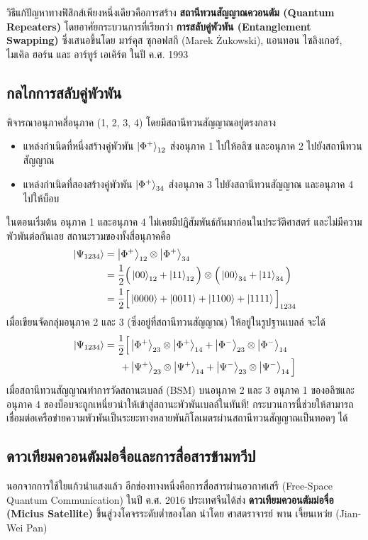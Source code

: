 วิธีแก้ปัญหาทางฟิสิกส์เพียงหนึ่งเดียวคือการสร้าง \textbf{สถานีทวนสัญญาณควอนตัม (Quantum Repeaters)} โดยอาศัยกระบวนการที่เรียกว่า \textbf{การสลับคู่พัวพัน (Entanglement Swapping)} ซึ่งเสนอขึ้นโดย มาร์คุส ซุกอฟสกี (Marek Żukowski), แอนทอน ไซลิงเกอร์, ไมเคิล ฮอร์น และ อาร์ทูร์ เอเคิร์ต ในปี ค.ศ. 1993

\subsection{กลไกการสลับคู่พัวพัน}
พิจารณาอนุภาคสี่อนุภาค (1, 2, 3, 4) โดยมีสถานีทวนสัญญาณอยู่ตรงกลาง
\begin{itemize}
    \item แหล่งกำเนิดที่หนึ่งสร้างคู่พัวพัน $\ket{\Phi^+}_{12}$ ส่งอนุภาค 1 ไปให้อลิซ และอนุภาค 2 ไปยังสถานีทวนสัญญาณ
    \item แหล่งกำเนิดที่สองสร้างคู่พัวพัน $\ket{\Phi^+}_{34}$ ส่งอนุภาค 3 ไปยังสถานีทวนสัญญาณ และอนุภาค 4 ไปให้บ็อบ
\end{itemize}
ในตอนเริ่มต้น อนุภาค 1 และอนุภาค 4 ไม่เคยมีปฏิสัมพันธ์กันมาก่อนในประวัติศาสตร์ และไม่มีความพัวพันต่อกันเลย สถานะรวมของทั้งสี่อนุภาคคือ
\begin{align}
\ket{\Psi_{1234}} &= \ket{\Phi^+}_{12} \otimes \ket{\Phi^+}_{34} \nonumber \\
&= \frac{1}{2} \Big( \ket{00}_{12} + \ket{11}_{12} \Big) \otimes \Big( \ket{00}_{34} + \ket{11}_{34} \Big) \nonumber \\
&= \frac{1}{2} \Big[ \ket{0000} + \ket{0011} + \ket{1100} + \ket{1111} \Big]_{1234}
\end{align}
เมื่อเขียนจัดกลุ่มอนุภาค 2 และ 3 (ซึ่งอยู่ที่สถานีทวนสัญญาณ) ให้อยู่ในรูปฐานเบลล์ จะได้
\begin{align}
\ket{\Psi_{1234}} = \frac{1}{2} \Big[ &\ket{\Phi^+}_{23} \otimes \ket{\Phi^+}_{14} + \ket{\Phi^-}_{23} \otimes \ket{\Phi^-}_{14} \nonumber \\
+ &\ket{\Psi^+}_{23} \otimes \ket{\Psi^+}_{14} + \ket{\Psi^-}_{23} \otimes \ket{\Psi^-}_{14} \Big]
\label{eq:entanglement_swapping_state}
\end{align}
เมื่อสถานีทวนสัญญาณทำการวัดสถานะเบลล์ (BSM) บนอนุภาค 2 และ 3 อนุภาค 1 ของอลิซและอนุภาค 4 ของบ็อบจะถูกเหนี่ยวนำให้เข้าสู่สถานะพัวพันเบลล์ในทันที! กระบวนการนี้ช่วยให้สามารถเชื่อมต่อเครือข่ายความพัวพันเป็นระยะทางหลายพันกิโลเมตรผ่านสถานีทวนสัญญาณเป็นทอดๆ ได้

\subsection{ดาวเทียมควอนตัมม่อจื่อและการสื่อสารข้ามทวีป}
นอกจากการใช้ใยแก้วนำแสงแล้ว อีกช่องทางหนึ่งคือการสื่อสารผ่านอวกาศเสรี (Free-Space Quantum Communication) ในปี ค.ศ. 2016 ประเทศจีนได้ส่ง \textbf{ดาวเทียมควอนตัมม่อจื่อ (Micius Satellite)} ขึ้นสู่วงโคจรระดับต่ำของโลก นำโดย ศาสตราจารย์ พาน เจี้ยนเหว่ย (Jian-Wei Pan)

